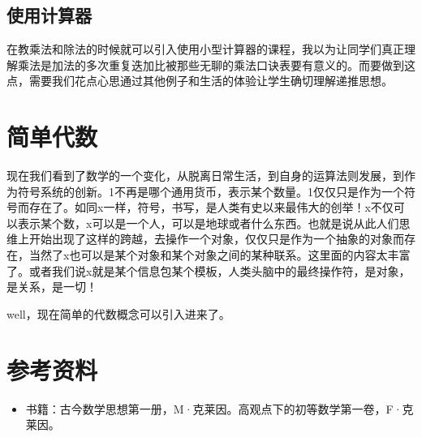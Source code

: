 \documentclass[11pt,oneside]{article}
\begin{document}
\subsection{使用计算器}
\label{sec-9-1}
在教乘法和除法的时候就可以引入使用小型计算器的课程，我以为让同学们真正理解乘法是加法的多次重复迭加比被那些无聊的乘法口诀表要有意义的。而要做到这点，需要我们花点心思通过其他例子和生活的体验让学生确切理解递推思想。


\section{简单代数}
\label{sec-10}
现在我们看到了数学的一个变化，从脱离日常生活，到自身的运算法则发展，到作为符号系统的创新。1不再是哪个通用货币，表示某个数量。1仅仅只是作为一个符号而存在了。如同x一样，符号，书写，是人类有史以来最伟大的创举！x不仅可以表示某个数，x可以是一个人，可以是地球或者什么东西。也就是说从此人们思维上开始出现了这样的跨越，去操作一个对象，仅仅只是作为一个抽象的对象而存在，当然了x也可以是某个对象和某个对象之间的某种联系。这里面的内容太丰富了。或者我们说x就是某个信息包某个模板，人类头脑中的最终操作符，是对象，是关系，是一切！

well，现在简单的代数概念可以引入进来了。




\section{参考资料}
\label{sec-11}
\begin{itemize}
\item 书籍：古今数学思想第一册，M·克莱因。高观点下的初等数学第一卷，F·克莱因。
\end{itemize}
\end{document}
